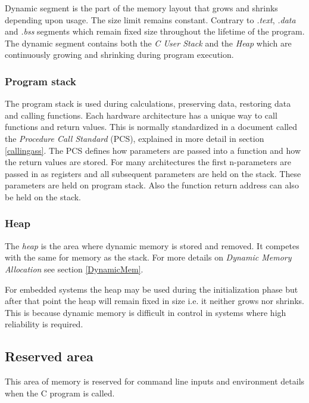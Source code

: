 Dynamic segment is the part of the memory layout that grows and shrinks depending upon usage. The size limit remains constant. Contrary to \textit{.text}, \textit{.data} and \textit{.bss} segments which remain fixed size throughout the lifetime of the program. The dynamic segment contains both the \textit{C User Stack} and the \textit{Heap} which are continuously growing and shrinking during program execution.

\subsubsection{Program stack}

The program stack is used during calculations, preserving data, restoring data and calling functions. Each hardware architecture has a unique way to call functions and return values. This is normally standardized in a document called the \textit{Procedure Call Standard} (PCS), explained in more detail in section \ref{callingass}. The PCS defines how parameters are passed into a function and how the return values are stored. For many architectures the first n-parameters are passed in as registers and all subsequent parameters are held on the stack. These parameters are held on program stack. Also the function return address can also be held on the stack.  

\subsubsection{Heap}

The \textit{heap} is the area where dynamic memory is stored and removed. It competes with the same for memory as the stack. For more details on \textit{Dynamic Memory Allocation} see section \ref{DynamicMem}.

For embedded systems the heap may be used during the initialization phase but after that point the heap will remain fixed in size i.e. it neither grows nor shrinks. This is because dynamic memory is difficult in control in systems where high reliability is required.

\subsection{Reserved area}

This area of memory is reserved for command line inputs and environment details when the C program is called.
